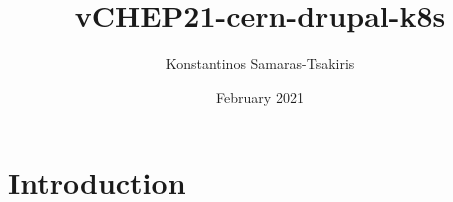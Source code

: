 \documentclass{article}
\title{vCHEP21-cern-drupal-k8s}
\author{Konstantinos Samaras-Tsakiris}
\date{February 2021}
\begin{document}
\maketitle

\section{Introduction}
\end{document}
